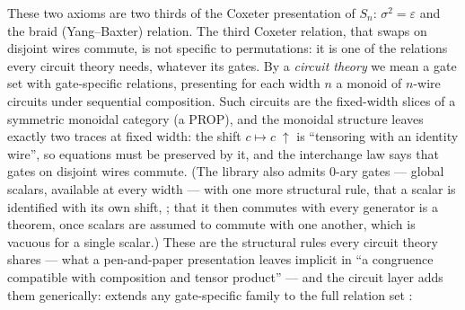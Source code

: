 \noindent These two axioms are two thirds of the Coxeter presentation of
$S_n$: $\sigma^2 = \varepsilon$ and the braid (Yang--Baxter) relation.
The third Coxeter relation, that swaps on disjoint wires commute, is not
specific to permutations: it is one of the relations every circuit
theory needs, whatever its gates.  By a
\emph{circuit theory} we mean a gate set with gate-specific relations,
presenting for each width $n$ a monoid of $n$-wire circuits under
sequential composition.  Such circuits are the fixed-width slices of a
symmetric monoidal category (a PROP), and the monoidal structure leaves
exactly two traces at fixed width: the shift $c \mapsto c\;{\uparrow}$ is
``tensoring with an identity wire'', so equations must be preserved by
it, and the interchange law says that gates on disjoint wires commute.
(The library also admits $0$-ary gates --- global scalars, available at
every width --- with one more structural rule, that a scalar is
identified with its own shift, ; that it then commutes with
every generator is a theorem, once scalars are assumed to commute with
one another, which is vacuous for a single scalar.)  These are the structural rules every
circuit theory shares --- what a
pen-and-paper presentation leaves implicit in ``a congruence compatible
with composition and tensor product'' --- and the circuit layer adds them
generically:  extends any
gate-specific family to the full relation set :

